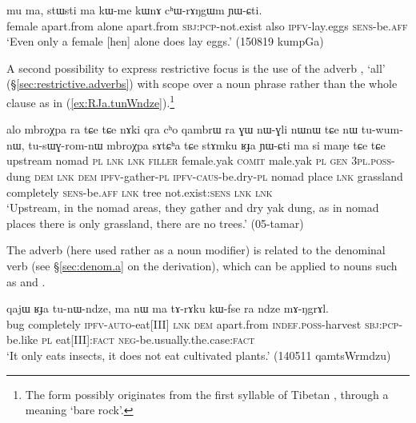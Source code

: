   \begin{exe}
\ex \label{ex:ma.kWme.kWnA}
\gll  mu ma, stɯsti ma kɯ-me kɯnɤ cʰɯ-rɤŋgɯm ɲɯ-ɕti. \\
female apart.from alone apart.from \textsc{sbj}:\textsc{pcp}-not.exist also \textsc{ipfv}-lay.eggs \textsc{sens}-be.\textsc{aff} \\
\glt `Even only a female [hen] alone does lay eggs.' (150819 kumpGa)
\end{exe}
   
A second possibility to express restrictive focus is the use of the adverb , `all' (§\ref{sec:restrictive.adverbs}) with scope over a noun phrase rather than the whole clause as in (\ref{ex:RJa.tunWndze}).\footnote{The form  possibly originates from the first syllable of Tibetan , through a meaning `bare rock'.}  

\begin{exe}
\ex \label{ex:stAmku.RJa}
\gll alo mbroχpa ra tɕe tɕe nɤki qra cʰo qambrɯ ra ɣɯ nɯ-ɣli nɯnɯ tɕe nɯ tu-wum-nɯ, tu-sɯɣ-rom-nɯ mbroχpa sɤtɕʰa tɕe stɤmku ʁɟa ɲɯ-ɕti ma si maŋe tɕe tɕe    \\
upstream nomad \textsc{pl} \textsc{lnk} \textsc{lnk} \textsc{filler} female.yak \textsc{comit} male.yak \textsc{pl} \textsc{gen} \textsc{3pl}.\textsc{poss}-dung \textsc{dem} \textsc{lnk} \textsc{dem} \textsc{ipfv}-gather-\textsc{pl} \textsc{ipfv}-\textsc{caus}-be.dry-\textsc{pl} nomad place \textsc{lnk} grassland completely \textsc{sens}-be.\textsc{aff} \textsc{lnk} tree not.exist:\textsc{sens} \textsc{lnk} \textsc{lnk}  \\
\glt `Upstream, in the nomad areas, they gather and dry yak dung, as in nomad places there is only grassland, there are no trees.' (05-tamar) 
\end{exe}

The adverb  (here used rather as a noun modifier) is related to the denominal verb  (see §\ref{sec:denom.a} on the  derivation), which can be applied to nouns such as  and .
 
\begin{exe}
\ex \label{ex:RJa.tunWndze}
 \gll qajɯ ʁɟa tu-nɯ-ndze, ma nɯ ma tɤ-rɤku kɯ-fse ra ndze mɤ-ŋgrɤl. \\
 bug completely \textsc{ipfv}-\textsc{auto}-eat[III] \textsc{lnk} \textsc{dem} apart.from \textsc{indef}.\textsc{poss}-harvest \textsc{sbj}:\textsc{pcp}-be.like \textsc{pl} eat[III]:\textsc{fact} \textsc{neg}-be.usually.the.case:\textsc{fact} \\ 
\glt `It only eats insects, it does not eat cultivated plants.' (140511 qamtsWrmdzu)
\end{exe}

